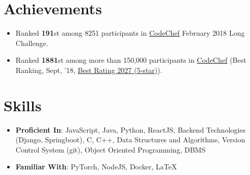 \documentclass[a4paper,11pt]{article}
\newcommand{\resumeSubHeadingListStart}{\begin{itemize}[leftmargin=*, topsep=0pt]}
\newcommand{\resumeSubHeadingListEnd}{\end{itemize}}
\newcommand{\resumeItemListStart}{\begin{itemize}}
\newcommand{\resumeItemListEnd}{\end{itemize}\vspace{-5pt}}
\begin{document}
\section{Achievements}
    \resumeItemListStart
     \setlength{\itemsep}{0.5pt}
      \item
        {Ranked \textbf{191}st among 8251 participants in \href{https://www.codechef.com/rankings/FEB18?filterBy=Institution\%3DNational\%20Institute\%20of\%20Technology\%2C\%20Durgapur&order=asc&sortBy=rank}{CodeChef} February 2018 Long Challenge.}
      \item
        {Ranked \textbf{1881}st among more than 150,000 participants in \href{https://codechef.com/users/ayan_nitd}{CodeChef} (Best Ranking, Sept, '18, \href{https://www.codechef.com/users/ayan_nitd}{Best Rating 2027 (5-star)}).}
    \resumeItemListEnd

\section{Skills}
 \resumeSubHeadingListStart
    \setlength{\itemsep}{1pt}
     \item\textbf{Proficient In}{: JavaScript, Java, Python, ReactJS, Backend Technologies (Django, Springboot), C, C++, Data Structures and Algorithms, Version Control System (git), Object Oriented Programming, DBMS}\\
     \item\textbf{Familiar With}{: PyTorch, NodeJS, Docker, \LaTeX}
 \resumeSubHeadingListEnd
 
\end{document}
